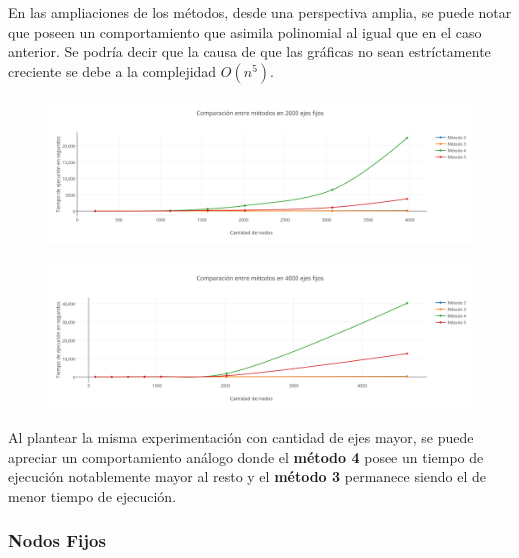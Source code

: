 En las ampliaciones de los m\'etodos, desde una perspectiva amplia, se puede notar que poseen un comportamiento que asimila polinomial al igual que en el caso anterior. Se podr\'ia decir que la causa de que las gr\'aficas no sean estr\'ictamente creciente se debe a la complejidad $O(n^5)$.

\newpage

   \begin{figure}[h!]
   \begin{center}
 	\includegraphics[scale=0.55]{imagenes/local/tiempos/2000ejes.png}
   \end{center}
 \end{figure}
 
  \begin{figure}[h!]
   \begin{center}
 	\includegraphics[scale=0.55]{imagenes/local/tiempos/4000ejes.png}
   \end{center}
 \end{figure}
  
Al plantear la misma experimentaci\'on con cantidad de ejes mayor, se puede apreciar un comportamiento an\'alogo donde el \textbf{m\'etodo 4} posee un tiempo de ejecuci\'on notablemente mayor al resto y el \textbf{m\'etodo 3} permanece siendo el de menor tiempo de ejecuci\'on.  
  
 \newpage  
  
\subsubsection*{Nodos Fijos}

